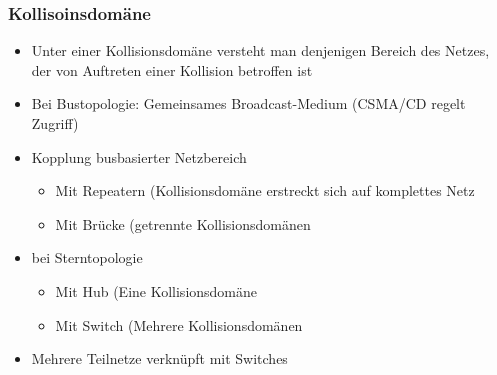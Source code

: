     \subsubsection{Kollisoinsdomäne}
      \begin{itemize}
        \item Unter einer Kollisionsdomäne versteht man denjenigen Bereich des Netzes, der von
          Auftreten einer Kollision betroffen ist
        \item Bei Bustopologie: Gemeinsames Broadcast-Medium (CSMA/CD regelt Zugriff)
        \item Kopplung busbasierter Netzbereich
          \begin{itemize}
            \item Mit Repeatern (Kollisionsdomäne erstreckt sich auf komplettes Netz
            \item Mit Brücke (getrennte Kollisionsdomänen
          \end{itemize}
        \item bei Sterntopologie
          \begin{itemize}
            \item Mit Hub (Eine Kollisionsdomäne
            \item Mit Switch (Mehrere Kollisionsdomänen
          \end{itemize}
        \item Mehrere Teilnetze verknüpft mit Switches
      \end{itemize}
